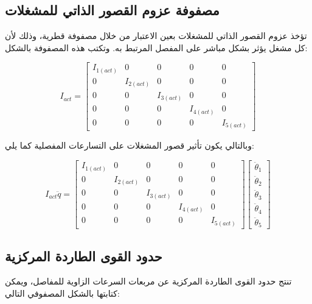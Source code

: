 \subsection*{مصفوفة عزوم القصور الذاتي للمشغلات}

تؤخذ عزوم القصور الذاتي للمشغلات بعين الاعتبار من خلال مصفوفة قطرية، وذلك لأن كل مشغل يؤثر بشكل مباشر على المفصل المرتبط به. وتكتب هذه المصفوفة بالشكل:

\begin{equation}
I_{act} =
\begin{bmatrix}
I_{1(act)} & 0 & 0 & 0 & 0 \\
0 & I_{2(act)} & 0 & 0 & 0 \\
0 & 0 & I_{3(act)} & 0 & 0 \\
0 & 0 & 0 & I_{4(act)} & 0 \\
0 & 0 & 0 & 0 & I_{5(act)}
\end{bmatrix}
\end{equation}

وبالتالي يكون تأثير قصور المشغلات على التسارعات المفصلية كما يلي:

\begin{equation}
I_{act}\ddot{q} =
\begin{bmatrix}
I_{1(act)} & 0 & 0 & 0 & 0 \\
0 & I_{2(act)} & 0 & 0 & 0 \\
0 & 0 & I_{3(act)} & 0 & 0 \\
0 & 0 & 0 & I_{4(act)} & 0 \\
0 & 0 & 0 & 0 & I_{5(act)}
\end{bmatrix}
\begin{bmatrix}
\ddot{\theta}_1 \\
\ddot{\theta}_2 \\
\ddot{\theta}_3 \\
\ddot{\theta}_4 \\
\ddot{\theta}_5
\end{bmatrix}
\end{equation}

\subsection*{حدود القوى الطاردة المركزية}

تنتج حدود القوى الطاردة المركزية عن مربعات السرعات الزاوية للمفاصل، ويمكن كتابتها بالشكل المصفوفي التالي:

